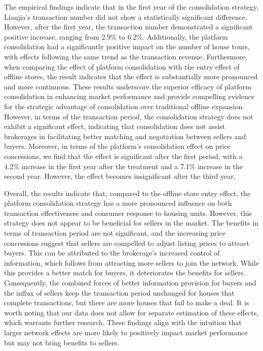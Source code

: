 \documentclass[11pt]{article}
\begin{document}
The empirical findings indicate that in the first year of the consolidation strategy, Lianjia's transaction number did not show a statistically significant difference. However, after the first year, the transaction number demonstrated a significant positive increase, ranging from 2.9\% to 6.2\%. Additionally, the platform consolidation had a significantly positive impact on the number of house tours, with effects following the same trend as the transaction revenue. Furthermore, when comparing the effect of platform consolidation with the entry effect of offline stores, the result indicates that the effect is substantially more pronounced and more continuous. These results underscore the superior efficacy of platform consolidation in enhancing market performance and provide compelling evidence for the strategic advantage of consolidation over traditional offline expansion. However, in terms of the transaction period, the consolidation strategy does not exhibit a significant effect, indicating that consolidation does not assist brokerages in facilitating better matching and negotiation between sellers and buyers. Moreover, in terms of the platform's consolidation effect on price concessions, we find that the effect is significant after the first period, with a 4.2\% increase in the first year after the treatment and a 7.1\% increase in the second year. However, the effect becomes insignificant after the third year. 

Overall, the results indicate that, compared to the offline store entry effect, the platform consolidation strategy has a more pronounced influence on both transaction effectiveness and consumer response to housing units. However, this strategy does not appear to be beneficial for sellers in the market. The benefits in terms of transaction period are not significant, and the increasing price concessions suggest that sellers are compelled to adjust listing prices to attract buyers. This can be attributed to the brokerage's increased control of information, which follows from attracting more sellers to join the network. While this provides a better match for buyers, it deteriorates the benefits for sellers. Consequently, the combined forces of better information provision for buyers and the influx of sellers keep the transaction period unchanged for houses that complete transactions, but there are more houses that fail to make a deal. It is worth noting that our data does not allow for separate estimation of these effects, which warrants further research. These findings align with the intuition that larger network effects are more likely to positively impact market performance but may not bring benefits to sellers.
\end{document}
